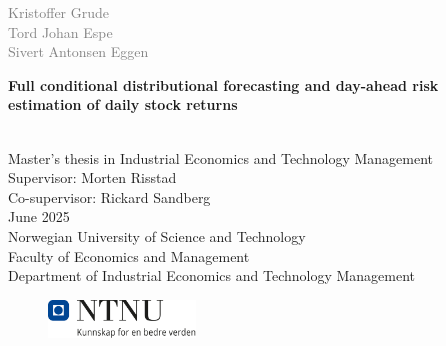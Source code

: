 \begin{titlepage}
\vspace*{1.5cm}

\noindent  \textcolor{gray}{\large Kristoffer Grude} \\
\noindent  \textcolor{gray}{\large Tord Johan Espe} \\
\noindent  \textcolor{gray}{\large Sivert Antonsen Eggen} \\
\vspace{1cm}

\noindent \textbf{\Large Full conditional distributional forecasting and day-ahead risk estimation of daily stock returns} \\
\vspace{0.5cm}

 \\

\vspace{6cm}
\noindent Master’s thesis in Industrial Economics and Technology Management \\
Supervisor: Morten Risstad \\
Co-supervisor: Rickard Sandberg \\
June 2025 \\

\vspace{0.2cm}
\noindent Norwegian University of Science and Technology \\
Faculty of Economics and Management \\
Department of Industrial Economics and Technology Management \\

\begin{figure}[h]
    \includegraphics[width=0.35\textwidth]{Images/Front page/NTNU_logo.png}
\end{figure}
\end{titlepage}
\restoregeometry
